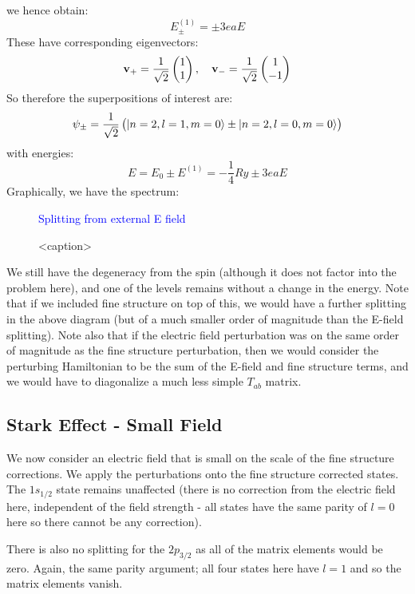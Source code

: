 we hence obtain:
\begin{equation}
    E^{(1)}_\pm = \pm 3eaE
\end{equation}
These have corresponding eigenvectors:
\begin{equation}
    \mathbf{v}_+ = \frac{1}{\sqrt{2}}\begin{pmatrix}1\\1\end{pmatrix}, \quad \mathbf{v}_- = \frac{1}{\sqrt{2}}\begin{pmatrix}1\\-1\end{pmatrix}
\end{equation}
So therefore the superpositions of interest are:
\begin{equation}
    \psi_\pm = \frac{1}{\sqrt{2}}\left(\lvert n=2, l=1, m=0 \rangle \pm \lvert n=2, l=0, m=0 \rangle\right)
\end{equation}
with energies:
\begin{equation}
    E = E_0 \pm E^{(1)} =  -\frac{1}{4}\si{Ry} \pm 3eaE 
\end{equation}
Graphically, we have the spectrum:
\begin{figure}[htbp]
    \centering
    \textcolor{blue}{Splitting from external E field}
    \caption{<caption>}
    \label{<label>}
\end{figure}
We still have the degeneracy from the spin (although it does not factor into the problem here), and one of the levels remains without a change in the energy. Note that if we included fine structure on top of this, we would have a further splitting in the above diagram (but of a much smaller order of magnitude than the E-field splitting). Note also that if the electric field perturbation was on the same order of magnitude as the fine structure perturbation, then we would consider the perturbing Hamiltonian to be the sum of the E-field and fine structure terms, and we would have to diagonalize a much less simple $T_{ab}$ matrix.

\subsection{Stark Effect - Small Field}
We now consider an electric field that is small on the scale of the fine structure corrections. We apply the perturbations onto the fine structure corrected states. The $1s_{1/2}$ state remains unaffected (there is no correction from the electric field here, independent of the field strength - all states have the same parity of $l = 0$ here so there cannot be any correction).

There is also no splitting for the $2p_{3/2}$ as all of the matrix elements would be zero. Again, the same parity argument; all four states here have $l = 1$ and so the matrix elements vanish.

